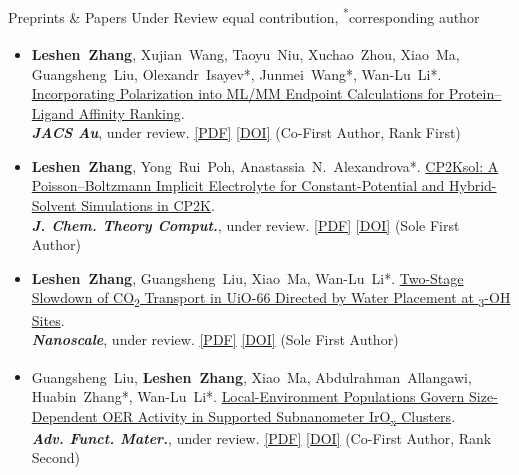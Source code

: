 \documentclass{resume} %
\newcommand{\me}{\textbf{\setbox0\hbox{Leshen Zhang}\rlap{\rule[-2.4pt]{\wd0}{0.9pt}}\box0}} %
\newcommand{\eq}{\textsuperscript{\textdaggerdbl}}
\newcommand{\ptitle}[1]{#1} %
\newcommand{\bluehref}[2]{{\hypersetup{urlcolor=blue}\href{#1}{#2}}} %
\begin{document}
\begin{rSection}{Preprints \& Papers Under Review \hfill {\normalfont\footnotesize \textsuperscript{\textdaggerdbl}equal contribution, \textsuperscript{*}corresponding author}}

{\small\begin{itemize}[leftmargin=2.6em,labelsep=0.4em,itemsep=1pt]
  \item[\textbf{[S.1]}] \hypertarget{S.1}{}\me\eq, Xujian~Wang\eq, Taoyu~Niu, Xuchao~Zhou, Xiao~Ma, Guangsheng~Liu, Olexandr~Isayev*, Junmei~Wang*, Wan-Lu~Li*. \href{https://doi.org/10.26434/chemrxiv.15011517/v1}{\ptitle{Incorporating Polarization into ML/MM Endpoint Calculations for Protein--Ligand Affinity Ranking}}. \\ \textbf{\textit{JACS Au}}, under review. \bluehref{https://chemrxiv.org/doi/pdf/10.26434/chemrxiv.15011517/v1}{[PDF]} \bluehref{https://doi.org/10.26434/chemrxiv.15011517/v1}{[DOI]} (Co-First Author, Rank First)
  \item[\textbf{[S.2]}] \hypertarget{S.2}{}\me, Yong~Rui~Poh, Anastassia~N.~Alexandrova*. \href{https://doi.org/10.26434/chemrxiv.15012907/v1}{\ptitle{CP2Ksol: A Poisson--Boltzmann Implicit Electrolyte for Constant-Potential and Hybrid-Solvent Simulations in CP2K}}. \\ \textbf{\textit{J. Chem. Theory Comput.}}, under review. \bluehref{https://chemrxiv.org/doi/pdf/10.26434/chemrxiv.15012907/v1}{[PDF]} \bluehref{https://doi.org/10.26434/chemrxiv.15012907/v1}{[DOI]} (Sole First Author)
  \item[\textbf{[S.3]}] \hypertarget{S.3}{}\me, Guangsheng~Liu, Xiao~Ma, Wan-Lu~Li*. \href{https://doi.org/10.26434/chemrxiv.15012795/v1}{\ptitle{Two-Stage Slowdown of CO\textsubscript{2} Transport in UiO-66 Directed by Water Placement at \textmu\textsubscript{3}-OH Sites}}. \\ \textbf{\textit{Nanoscale}}, under review. \bluehref{https://chemrxiv.org/doi/pdf/10.26434/chemrxiv.15012795/v1}{[PDF]} \bluehref{https://doi.org/10.26434/chemrxiv.15012795/v1}{[DOI]} (Sole First Author)
  \item[\textbf{[S.4]}] \hypertarget{S.4}{}Guangsheng~Liu\eq, \me\eq, Xiao~Ma, Abdulrahman~Allangawi, Huabin~Zhang*, Wan-Lu~Li*. \href{https://doi.org/10.26434/chemrxiv.15009834/v1}{\ptitle{Local-Environment Populations Govern Size-Dependent OER Activity in Supported Subnanometer IrO\textsubscript{x} Clusters}}. \\ \textbf{\textit{Adv. Funct. Mater.}}, under review. \bluehref{https://leshenzhang.github.io/papers/S2_Liu2026_ChemRxiv.pdf}{[PDF]} \bluehref{https://doi.org/10.26434/chemrxiv.15009834/v1}{[DOI]} (Co-First Author, Rank Second)

\end{itemize}}
\end{rSection}
\end{document}
